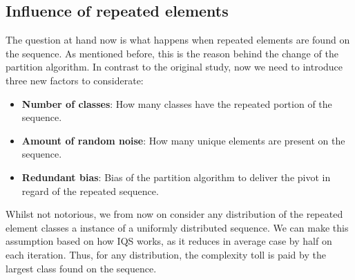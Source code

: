 \subsection{Influence of repeated elements}

The question at hand now is what happens when repeated elements are found on the sequence. As mentioned before, this is the reason behind the change of the partition algorithm. In contrast to the original study, now we need to introduce three new factors to considerate:

\begin{itemize}
    \item \textbf{Number of classes}: How many classes have the repeated portion of the sequence.
    \item \textbf{Amount of random noise}: How many unique elements are present on the sequence.
    \item \textbf{Redundant bias}: Bias of the partition algorithm to deliver the pivot in regard of the repeated sequence.
\end{itemize}

Whilst not notorious, we from now on consider any distribution of the repeated element classes a instance of a uniformly distributed sequence. We can make this assumption based on how IQS works, as it reduces in average case by half on each iteration. Thus, for any distribution, the complexity toll is paid by the largest class found on the sequence.\\

